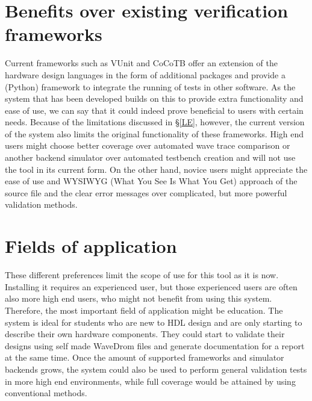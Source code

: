 \section{Benefits over existing verification frameworks}
Current frameworks such as VUnit and CoCoTB offer an extension of the hardware design languages in the form of additional packages and provide a (Python) framework to integrate the running of tests in other software. As the system that has been developed builds on this to provide extra functionality and ease of use, we can say that it could indeed prove beneficial to users with certain needs. Because of the limitations discussed in §\ref{LE}, however, the current version of the system also limits the original functionality of these frameworks.
\npar
High end users might choose better coverage over automated wave trace comparison or another backend simulator over automated testbench creation and will not use the tool in its current form. On the other hand, novice users might appreciate the ease of use and WYSIWYG (What You See Is What You Get) approach of the source file and the clear error messages over complicated, but more powerful validation methods.
\section{Fields of application}
These different preferences limit the scope of use for this tool as it is now. Installing it requires an experienced user, but those experienced users are often also more high end users, who might not benefit from using this system. Therefore, the most important field of application might be education. The system is ideal for students who are new to HDL design and are only starting to describe their own hardware components. They could start to validate their designs using self made WaveDrom files and generate documentation for a report at the same time.
\npar
Once the amount of supported frameworks and simulator backends grows, the system could also be used to perform general validation tests in more high end environments, while full coverage would be attained by using conventional methods.

